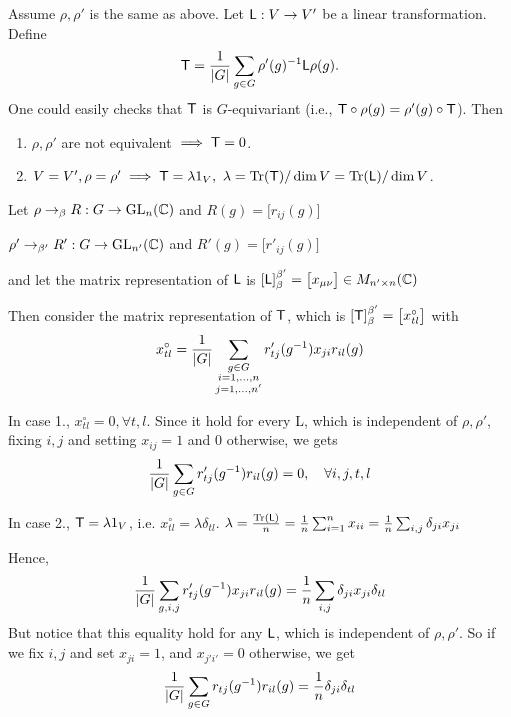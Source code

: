 \begin{coro}
  Assume $\rho, \rho'$ is the same as above. Let ${\sf L}: V \to V'$ be a linear transformation.
  Define
  \[
    {\sf T} = \frac{1}{\lvert G\rvert} \sum_{g\in G} \rho'(g)^{-1} {\sf L} \rho(g).
  \]
  One could easily checks that ${\sf T}$ is $G$-equivariant (i.e., ${\sf T} \circ \rho(g)
  = \rho'(g) \circ {\sf T}$). Then
  \begin{enumerate}
    \item $\rho, \rho'$ are not equivalent $\implies {\sf T} = 0$.
    \item $V = V', \rho = \rho' \implies {\sf T} = \lambda 1_V, \ 
      \lambda = \trace({\sf T}) / \dim V = \trace({\sf L}) / \dim V$.
  \end{enumerate}
\end{coro}

\begin{remark}
  Let $\rho \to_\beta R: G \to \text{GL}_n(\mathbb{C})$ and $R(g) = \big[r_{ij}(g)\big]$

  $\rho' \to_{\beta'} R': G \to \text{GL}_{n'}(\mathbb{C})$ and $R'(g) = \big[ r'_{ij}(g) \big]$

  and let the matrix representation of ${\sf L}$ is
  $[{\sf L}]^{\beta'}_\beta = \big[ x_{\mu\nu} \big] \in M_{n' \times n}(\mathbb{C})$

  Then consider the matrix representation of ${\sf T}$, which is
  $[{\sf T}]^{\beta'}_\beta = \big[ x^\circ_{tl} \big]$ with
  \[
    x^\circ_{tl} = \frac{1}{\lvert G\rvert}
    \sum_{\substack{g\in G \\ i=1,\dots, n \\ j=1,\dots, n'}}
    r'_{tj}(g^{-1})x_{ji}r_{il}(g)
  \]

  In case 1., $x^\circ_{tl} = 0, \forall t, l$. Since it hold for every {\sf L},
  which is independent of $\rho, \rho'$, fixing $i, j$ and setting $x_{ij} = 1$
  and $0$ otherwise, we gets
  \[ \frac{1}{\lvert G\rvert} \sum_{g \in G} r'_{tj}(g^{-1}) r_{il}(g) = 0,
    \quad \forall i, j, t, l \]


  In case 2., ${\sf T} = \lambda 1_V$, i.e.
  $x^\circ_{tl} = \lambda \delta_{tl}$.
  $\lambda = \frac{\operatorname{Tr}({\sf L})}{n} = \frac{1}{n} \sum_{i=1}^n x_{ii}
  = \frac{1}{n} \sum_{i,j} \delta_{ji}x_{ji}$

  Hence,
  \[
    \frac{1}{\lvert G\rvert} \sum_{g, i, j} r'_{tj}(g^{-1}) x_{ji} r_{il}(g)
    = \frac{1}{n} \sum_{i, j} \delta_{ji} x_{ji} \delta_{tl}
  \]
  But notice that this equality hold for any ${\sf L}$, which is independent of
  $\rho, \rho'$. So if we fix $i, j$ and set $x_{ji} = 1$, and $x_{j'i'} = 0$ otherwise,
  we get
  \[
    \frac{1}{\lvert G\rvert} \sum_{g\in G}
    r_{tj}(g^{-1})r_{il}(g) = \frac{1}{n} \delta_{ji}\delta_{tl}
  \]
\end{remark}

